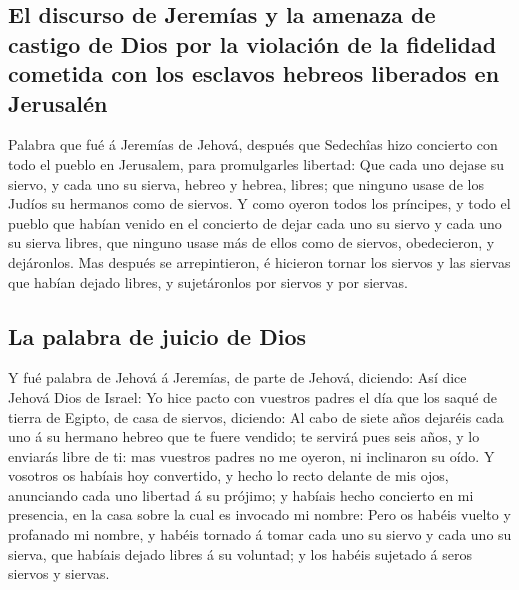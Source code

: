 \hypertarget{el-discurso-de-jeremuxedas-y-la-amenaza-de-castigo-de-dios-por-la-violaciuxf3n-de-la-fidelidad-cometida-con-los-esclavos-hebreos-liberados-en-jerusaluxe9n}{%
\subsection{El discurso de Jeremías y la amenaza de castigo de Dios por
la violación de la fidelidad cometida con los esclavos hebreos liberados
en
Jerusalén}\label{el-discurso-de-jeremuxedas-y-la-amenaza-de-castigo-de-dios-por-la-violaciuxf3n-de-la-fidelidad-cometida-con-los-esclavos-hebreos-liberados-en-jerusaluxe9n}}

 Palabra que fué á Jeremías de Jehová, después que Sedechîas
hizo concierto con todo el pueblo en Jerusalem, para promulgarles
libertad:  Que cada uno dejase su siervo, y cada uno su
sierva, hebreo y hebrea, libres; que ninguno usase de los Judíos su
hermanos como de siervos.  Y como oyeron todos los
príncipes, y todo el pueblo que habían venido en el concierto de dejar
cada uno su siervo y cada uno su sierva libres, que ninguno usase más de
ellos como de siervos, obedecieron, y dejáronlos.  Mas
después se arrepintieron, é hicieron tornar los siervos y las siervas
que habían dejado libres, y sujetáronlos por siervos y por siervas.

\hypertarget{la-palabra-de-juicio-de-dios}{%
\subsection{La palabra de juicio de
Dios}\label{la-palabra-de-juicio-de-dios}}

 Y fué palabra de Jehová á Jeremías, de parte de Jehová,
diciendo:  Así dice Jehová Dios de Israel: Yo hice pacto
con vuestros padres el día que los saqué de tierra de Egipto, de casa de
siervos, diciendo:  Al cabo de siete años dejaréis cada uno
á su hermano hebreo que te fuere vendido; te servirá pues seis años, y
lo enviarás libre de ti: mas vuestros padres no me oyeron, ni inclinaron
su oído.  Y vosotros os habíais hoy convertido, y hecho lo
recto delante de mis ojos, anunciando cada uno libertad á su prójimo; y
habíais hecho concierto en mi presencia, en la casa sobre la cual es
invocado mi nombre:  Pero os habéis vuelto y profanado mi
nombre, y habéis tornado á tomar cada uno su siervo y cada uno su
sierva, que habíais dejado libres á su voluntad; y los habéis sujetado á
seros siervos y siervas.

